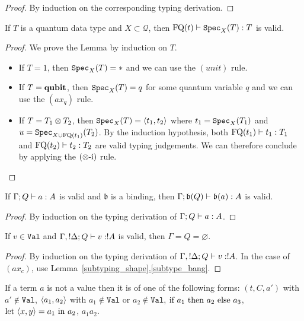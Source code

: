 \documentclass[twoside]{article}
\begin{document}
\begin{proof}
By induction on the corresponding typing derivation.
\end{proof}

\begin{lemma}
\label{specimen}
If $T$ is a quantum data type and $X\subset \mathcal{Q}$, then 
$\mathop{\textrm{FQ}}\nolimits(t)\vdash \texttt{Spec}_X(T):T$ is valid.
\end{lemma}

\begin{proof}
We prove the Lemma by induction on $T$.
  \begin{itemize}
    \item If $T=1$, then $\texttt{Spec}_X(T)=*$ and we can use the $(unit)$ rule.
    \item If $T=\textrm{\bf qubit}$, then $\texttt{Spec}_X(T)=q$ for some quantum variable $q$ and we can 
          use the $(ax_q)$ rule.
    \item If $T=T_1\otimes T_2$, then $\texttt{Spec}_X(T)=\langle t_1,t_2\rangle$ where $t_1=\texttt{Spec}_X(T_1)$ 
          and $u=\texttt{Spec}_{X\cup \mathop{\textrm{FQ}}\nolimits(t_1)}(T_2)$. By the induction hypothesis, both 
          $\mathop{\textrm{FQ}}\nolimits(t_1)\vdash t_1:T_1$ and $\mathop{\textrm{FQ}}\nolimits(t_2)\vdash t_2:T_2$ are valid typing 
          judgements. We can therefore conclude by applying the $(\otimes\mbox{-i})$ rule.
  \end{itemize}
\end{proof}

\begin{lemma}
\label{binding_judgement}
If $\Gamma;Q \vdash a:A$ is valid and $\mathfrak{b}$ is a 
binding, then $\Gamma;\mathfrak{b} (Q) \vdash \mathfrak{b}(a):A$ is valid.
\end{lemma}

\begin{proof}
By induction on the typing derivation of $\Gamma;Q \vdash a:A$.
\end{proof}

\begin{lemma}
\label{context_value}
If $v\in\mathtt{Val}$ and $\Gamma,!\Delta;Q \vdash v:!A$ is valid, 
then $\Gamma=Q=\varnothing$.
\end{lemma}

\begin{proof}
By induction on the typing derivation of $\Gamma,!\Delta;Q \vdash v:!A$. 
In the case of $(ax_c)$, use Lemma~\hyperref[subtype_bang]{\ref*{subtyping_shape}.\ref*{subtype_bang}}.
\end{proof}

\begin{lemma}
\label{non_values}
If a term $a$ is not a value then it is of one 
of the following forms: $(t,C,a')$ with $a'\notin \mathtt{Val}$, 
$\langle a_1,a_2\rangle$ with $a_1\notin \mathtt{Val}$ or $a_2\notin \mathtt{Val}$, 
$\text{if}~ a_1 ~\text{then}~ a_2 ~\text{else}~ a_3$, $\text{let}~ \langle x,y\rangle = a_1 ~\text{in}~ a_2$, $a_1a_2$.
\end{lemma}
\end{document}
